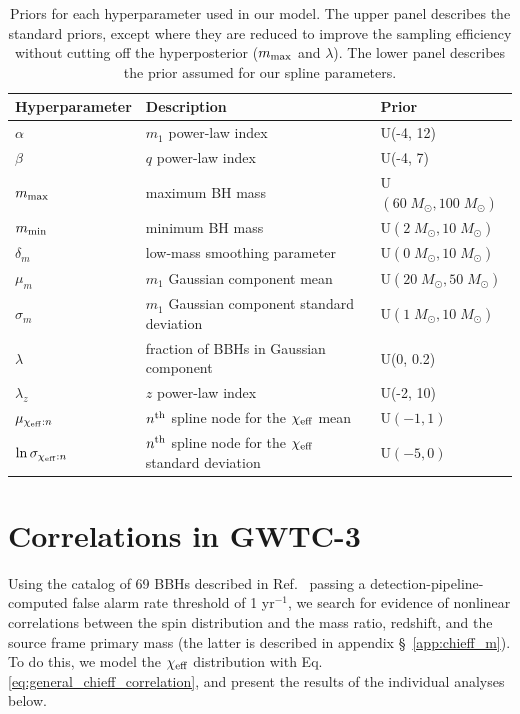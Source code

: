 \documentclass[%
 reprint,
 amsmath,amssymb,
 aps,
 prd,
]{revtex4-2}
\newcommand{\chieff}{\chi_{\rm eff}}
\newcommand{\Msun}{\;M_\odot}
\newcommand{\rednote}[1]{{\color{Red} #1}}
\begin{document}
\renewcommand{\arraystretch}{1.3}
\renewcommand{\tabcolsep}{0.3cm}
\begin{table}
    \centering
    \begin{tabular}{|l||ll|}
       \hline Hyperparameter & Description & Prior \\
       \hline $\alpha$ & $m_1$ power-law index & U(-4, 12) \\
       $\beta$ & $q$ power-law index & U(-4, 7) \\
       $m_{\rm max}$ & maximum BH mass & U$(60\Msun, 100\Msun)$ \\
       $m_{\rm min}$ & minimum BH mass & U$(2\Msun, 10\Msun)$ \\
       $\delta_m$ & low-mass smoothing parameter & U$(0\Msun, 10\Msun)$ \\
       $\mu_{m}$ & $m_1$ Gaussian component mean & U$(20\Msun, 50\Msun)$ \\
       $\sigma_{m}$ & $m_1$ Gaussian component standard deviation  & U$(1\Msun, 10\Msun)$ \\
       $\lambda$ & fraction of BBHs in Gaussian component & U(0, 0.2) \\
       $\lambda_z$ & $z$ power-law index & U(-2, 10) \\
       \hline $\mu_{\chieff:n}$ & $n^{\rm th}$ spline node for the $\chieff$ mean & U$(-1,1)$ \\
       $\ln\sigma_{\chieff:n}$ & $n^{\rm th}$ spline node for the $\chieff$ standard deviation & U$(-5,0)$
       \\ \hline
       
    \end{tabular}
    \caption{Priors for each hyperparameter used in our model. The upper panel describes the standard priors, except where they are reduced to improve the sampling efficiency without cutting off the hyperposterior ($m_{\rm max}$ and $\lambda$). The lower panel describes the prior assumed for our spline parameters.}
    \label{tab:prior_table}
\end{table}

 
\section{Correlations in \ac{GWTC-3}}
\label{sec:GWTC3_results}

Using the catalog of 69 BBHs described in Ref.~\cite{KAGRA:2021duu}  passing a detection-pipeline-computed false alarm rate threshold of 1 yr${}^{-1}$, we search for evidence of nonlinear correlations between the spin distribution and the mass ratio, redshift, and the source frame primary mass (the latter is described in appendix \S~\ref{app:chieff_m}). %
To do this, we model the $\chieff$ distribution with Eq. \ref{eq:general_chieff_correlation}, and present the results of the individual analyses below.
\end{document}
